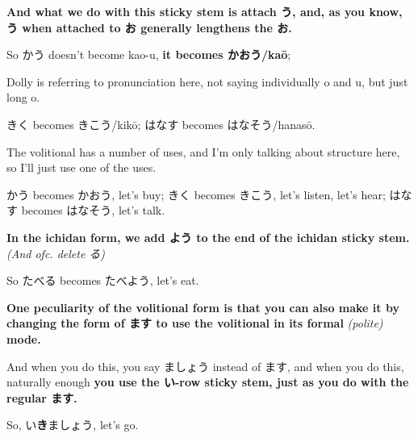 \startsectionlevel[title={The volitional},reference={the-volitional}]

{\bf And what we do with this sticky stem is attach う, and, as you know, う when attached to お generally lengthens the お.}

So かう doesn't become kao-u, {\bf it becomes かおう/kaō};

Dolly is referring to pronunciation here, not saying individually o and u, but just long o.

きく becomes きこう/kikō; はなす becomes はなそう/hanasō.

The volitional has a number of uses, and I'm only talking about structure here, so I'll just use one of the uses.

かう becomes かおう, let's buy; きく becomes きこう, let's listen, let's hear;\crlf
はなす becomes はなそう, let's talk.

{\bf In the ichidan form, we add よう to the end of the ichidan sticky stem.} {\em (And ofc. delete る)}

So たべる becomes たべよう, let's eat.

{\bf One peculiarity of the volitional form is that you can also make it by changing the form of ます to use the volitional in its formal} {\em (polite)} {\bf mode.}

And when you do this, you say ましょう instead of ます, and when you do this, naturally enough {\bf you use the い-row sticky stem, just as you do with the regular ます.}

So, い{\bf き}ましょう, let's go.

\stopsectionlevel

\stopsectionlevel

\stopsectionlevel
